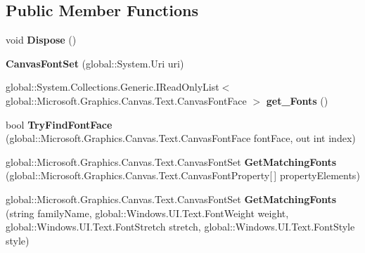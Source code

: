 \subsection*{Public Member Functions}
\begin{DoxyCompactItemize}
\item 
\mbox{\label{class_microsoft_1_1_graphics_1_1_canvas_1_1_text_1_1_canvas_font_set_a8f2287005fb2f87cc3459710f9266acc}} 
void {\bfseries Dispose} ()
\item 
\mbox{\label{class_microsoft_1_1_graphics_1_1_canvas_1_1_text_1_1_canvas_font_set_a1113ba1353deb4c7fe0e1a7dc51973da}} 
{\bfseries Canvas\+Font\+Set} (global\+::\+System.\+Uri uri)
\item 
\mbox{\label{class_microsoft_1_1_graphics_1_1_canvas_1_1_text_1_1_canvas_font_set_aefa89c8fcefa001d0d56c7165ffb79ac}} 
global\+::\+System.\+Collections.\+Generic.\+I\+Read\+Only\+List$<$ global\+::\+Microsoft.\+Graphics.\+Canvas.\+Text.\+Canvas\+Font\+Face $>$ {\bfseries get\+\_\+\+Fonts} ()
\item 
\mbox{\label{class_microsoft_1_1_graphics_1_1_canvas_1_1_text_1_1_canvas_font_set_a13e365d13ed355de227da7a3145714db}} 
bool {\bfseries Try\+Find\+Font\+Face} (global\+::\+Microsoft.\+Graphics.\+Canvas.\+Text.\+Canvas\+Font\+Face font\+Face, out int index)
\item 
\mbox{\label{class_microsoft_1_1_graphics_1_1_canvas_1_1_text_1_1_canvas_font_set_a4a5e120b147d6554e916b380746b72a5}} 
global\+::\+Microsoft.\+Graphics.\+Canvas.\+Text.\+Canvas\+Font\+Set {\bfseries Get\+Matching\+Fonts} (global\+::\+Microsoft.\+Graphics.\+Canvas.\+Text.\+Canvas\+Font\+Property\mbox{[}$\,$\mbox{]} property\+Elements)
\item 
\mbox{\label{class_microsoft_1_1_graphics_1_1_canvas_1_1_text_1_1_canvas_font_set_a1e65e79bf7c6294505e0162beef419fd}} 
global\+::\+Microsoft.\+Graphics.\+Canvas.\+Text.\+Canvas\+Font\+Set {\bfseries Get\+Matching\+Fonts} (string family\+Name, global\+::\+Windows.\+U\+I.\+Text.\+Font\+Weight weight, global\+::\+Windows.\+U\+I.\+Text.\+Font\+Stretch stretch, global\+::\+Windows.\+U\+I.\+Text.\+Font\+Style style)

\end{DoxyCompactItemize}
